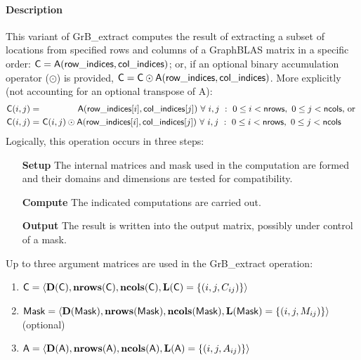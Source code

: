 \paragraph{Description}

This variant of {\sf GrB\_extract} computes the result of extracting a subset of
locations from specified rows and columns of a GraphBLAS matrix in a specific 
order: ${\sf C} = {\sf A}({\sf row\_indices},{\sf col\_indices})$; or, if an optional
binary accumulation operator ($\odot$) is provided, ${\sf C} = {\sf C} \odot
{\sf A}({\sf row\_indices},{\sf col\_indices})$.  
More explicitly (not accounting for an optional transpose of {\sf A}):
\[
\begin{aligned}
    {\sf C}(i,j) = &\ \ \ \ \ \ \ \ \ \ \ \ \ {\sf A}({\sf row\_indices}[i],{\sf col\_indices}[j]) 
    \ \forall \ i,j \ : \ 0 \leq i < {\sf nrows},\ 0 \leq j < {\sf ncols} \mbox{,~or~}
    \\
    {\sf C}(i,j) = &\ {\sf C}(i,j) \odot {\sf A}({\sf row\_indices}[i],{\sf col\_indices}[j])
    \ \forall \ i,j \ : \ 0 \leq i < {\sf nrows},\ 0 \leq j < {\sf ncols}
\end{aligned}
\]  
Logically, this operation occurs in three steps:
\begin{enumerate}[leftmargin=0.85in]
\item[\bf Setup] The internal matrices and mask used in the computation are formed and their 
domains and dimensions are tested for compatibility.
\item[\bf Compute] The indicated computations are carried out.
\item[\bf Output] The result is written into the output matrix, possibly under control of a mask.
\end{enumerate}

Up to three argument matrices are used in the {\sf GrB\_extract} operation:
\begin{enumerate}
	\item ${\sf C} = \langle \bold{D}({\sf C}),\bold{nrows}({\sf C}),
    \bold{ncols}({\sf C}),\bold{L}({\sf C}) = \{(i,j,C_{ij}) \} \rangle$

	\item ${\sf Mask} = \langle \bold{D}({\sf Mask}),\bold{nrows}({\sf Mask}),
    \bold{ncols}({\sf Mask}),\bold{L}({\sf Mask}) = \{(i,j,M_{ij}) \} \rangle$ (optional)

	\item ${\sf A} = \langle \bold{D}({\sf A}),\bold{nrows}({\sf A}),
    \bold{ncols}({\sf A}),\bold{L}({\sf A}) = \{(i,j,A_{ij}) \} \rangle$
\end{enumerate}

